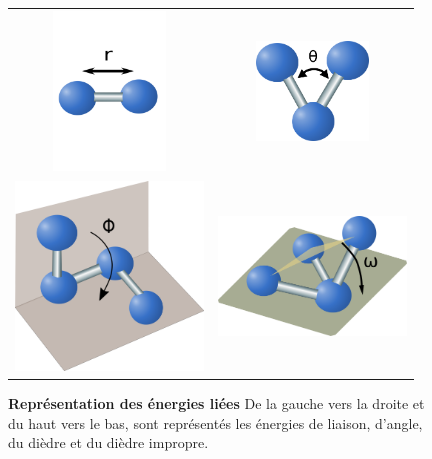    \begin{figure}[!htbp]
     \centering
     \begin{tabular}{cc}
       \includegraphics[width=3cm]{figure/liaison.png} &
       \includegraphics[width=3cm]{figure/angle.png} \\
       \includegraphics[width=5cm]{figure/dihedre.png} &
       \includegraphics[width=5cm]{figure/impropre.png} \\

     \end{tabular}
     
     \caption{\textbf{Représentation des énergies liées} De la gauche vers la droite et du haut vers le bas, sont représentés les énergies de liaison, d'angle, du dièdre et du dièdre impropre.}
\label{graph:Eliees}
   \end{figure}

